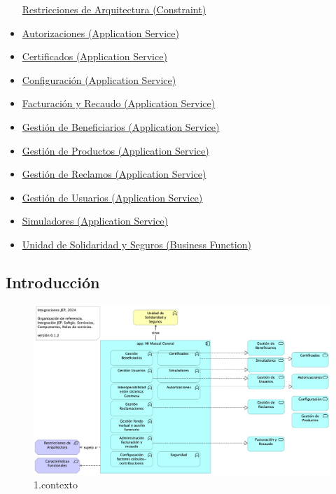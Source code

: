 \documentclass[
  paper=a4,
  ,captions=tableheading
]{scrartcl}
\begin{document}
\begin{itemize}
  \protect\hyperlink{restricciones-de-arquitectura-constraint}{Restricciones
  de Arquitectura (Constraint)}
\item
  \protect\hyperlink{autorizaciones-application-service}{Autorizaciones
  (Application Service)}
\item
  \protect\hyperlink{certificados-application-service}{Certificados
  (Application Service)}
\item
  \protect\hyperlink{configuraciuxf3n-application-service}{Configuración
  (Application Service)}
\item
  \protect\hyperlink{facturaciuxf3n-y-recaudo-application-service}{Facturación
  y Recaudo (Application Service)}
\item
  \protect\hyperlink{gestiuxf3n-de-beneficiarios-application-service}{Gestión
  de Beneficiarios (Application Service)}
\item
  \protect\hyperlink{gestiuxf3n-de-productos-application-service}{Gestión
  de Productos (Application Service)}
\item
  \protect\hyperlink{gestiuxf3n-de-reclamos-application-service}{Gestión
  de Reclamos (Application Service)}
\item
  \protect\hyperlink{gestiuxf3n-de-usuarios-application-service}{Gestión
  de Usuarios (Application Service)}
\item
  \protect\hyperlink{simuladores-application-service}{Simuladores
  (Application Service)}
\item
  \protect\hyperlink{unidad-de-solidaridad-y-seguros-business-function}{Unidad
  de Solidaridad y Seguros (Business Function)}
\end{itemize}

\hypertarget{introducciuxf3n-1}{%
\subsection{Introducción}\label{introducciuxf3n-1}}

\begin{figure}
\centering
\includegraphics{01.prop.contexto.png}
\caption{1.contexto}
\end{figure}
\end{document}
